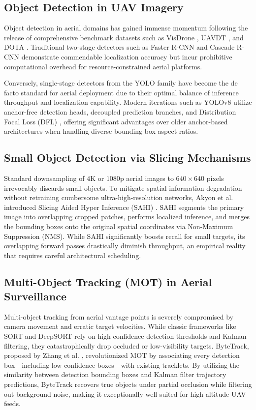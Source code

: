 \documentclass[conference]{IEEEtran}
\begin{document}
\subsection{Object Detection in UAV Imagery}
Object detection in aerial domains has gained immense momentum following the release of comprehensive benchmark datasets such as VisDrone \cite{zhu2021detection}, UAVDT \cite{du2018unmanned}, and DOTA \cite{xia2018dota}. Traditional two-stage detectors such as Faster R-CNN \cite{ren2015faster} and Cascade R-CNN demonstrate commendable localization accuracy but incur prohibitive computational overhead for resource-constrained aerial platforms. 

Conversely, single-stage detectors from the YOLO family \cite{redmon2016you, bochkovskiy2020yolov4, jocher2023ultralytics} have become the de facto standard for aerial deployment due to their optimal balance of inference throughput and localization capability. Modern iterations such as YOLOv8 utilize anchor-free detection heads, decoupled prediction branches, and Distribution Focal Loss (DFL) \cite{li2020generalized}, offering significant advantages over older anchor-based architectures when handling diverse bounding box aspect ratios.

\subsection{Small Object Detection via Slicing Mechanisms}
Standard downsampling of $4\text{K}$ or $1080\text{p}$ aerial images to $640\times 640$ pixels irrevocably discards small objects. To mitigate spatial information degradation without retraining cumbersome ultra-high-resolution networks, Akyon et al. introduced Slicing Aided Hyper Inference (SAHI) \cite{akyon2022sahi}. SAHI segments the primary image into overlapping cropped patches, performs localized inference, and merges the bounding boxes onto the original spatial coordinates via Non-Maximum Suppression (NMS). While SAHI significantly boosts recall for small targets, its overlapping forward passes drastically diminish throughput, an empirical reality that requires careful architectural scheduling.

\subsection{Multi-Object Tracking (MOT) in Aerial Surveillance}
Multi-object tracking from aerial vantage points is severely compromised by camera movement and erratic target velocities. While classic frameworks like SORT \cite{bewley2016simple} and DeepSORT \cite{wojke2017simple} rely on high-confidence detection thresholds and Kalman filtering, they catastrophically drop occluded or low-visibility targets. ByteTrack, proposed by Zhang et al. \cite{zhang2022bytetrack}, revolutionized MOT by associating every detection box—including low-confidence boxes—with existing tracklets. By utilizing the similarity between detection bounding boxes and Kalman filter trajectory predictions, ByteTrack recovers true objects under partial occlusion while filtering out background noise, making it exceptionally well-suited for high-altitude UAV feeds.
\end{document}
